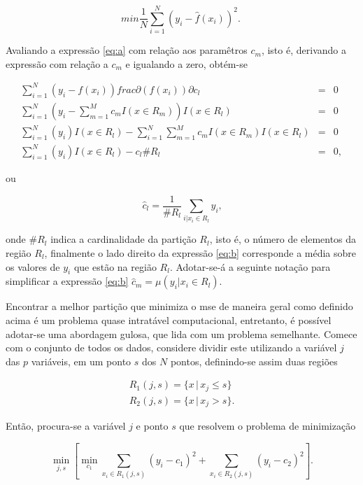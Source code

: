 \begin{equation}\label{eq:a}
min\frac{1}{N}\sum_{i=1}^N(y_i-\hat{f}(x_i))^2\mbox{.}~
\end{equation}

Avaliando a expressão \eqref{eq:a} com relação aos paramêtros $c_m$, isto é, derivando a expressão com relação a $c_m$ e igualando a zero, obtém-se

\begin{align}
\sum_{i=1}^N(y_i-f(x_i))frac{\partial(f(x_i))}{\partial{c_l}}&=&0\\
\sum_{i=1}^N(y_i-\sum_{m=1}^Mc_mI(x\in{R_m}))I(x\in{R_l})&=&0\\
\sum_{i=1}^N(y_i)I(x\in{R_l}) - \sum_{i=1}^N\sum_{m=1}^Mc_mI(x\in{R_m})I(x\in{R_l})&=&0\\
\sum_{i=1}^N(y_i)I(x\in{R_l}) - c_l \#R_l&=&0\mbox{,}~
\end{align}

ou

\begin{equation}\label{eq:b}
\hat{c}_l=\frac{1}{\#R_l}\sum_{i|x_i \in{R_l}}y_i\mbox{,}
\end{equation}

onde $\#R_l$ indica a cardinalidade da partição $R_l$, isto é, o número de elementos da região $R_l$, finalmente o lado direito da expressão \eqref{eq:b} corresponde a média sobre os valores de $y_i$ que estão na região $R_l$. Adotar-se-á a seguinte notação para simplificar a expressão \eqref{eq:b} $\hat{c}_m=\mu(y_i|x_i\in{R_l})$. 

Encontrar a melhor partição que minimiza o mse de maneira geral como definido acima é um problema quase intratável computacional, entretanto, é possível adotar-se uma abordagem gulosa, que lida com um problema semelhante. Comece com o conjunto de todos os dados, considere dividir este utilizando a variável $j$ das $p$ variáveis, em um ponto $s$ dos $N$ pontos, definindo-se assim duas regiões

\begin{align}
R_1(j,s) = \{x\,|\,x_j\le{s}\}\\
R_2(j,s) = \{x\,|\,x_j>s\}\mbox{.}
\end{align}

Então, procura-se a variável $j$ e ponto $s$ que resolvem o problema de minimização

\begin{equation}
\min_{j,s}\left[\min_{c_1}\sum_{x_i\in{R_1(j,s)}}(y_i-c_1)^2+\sum_{x_i\in{R_2(j,s)}}(y_i-c_2)^2\right]\mbox{.}
\end{equation}


